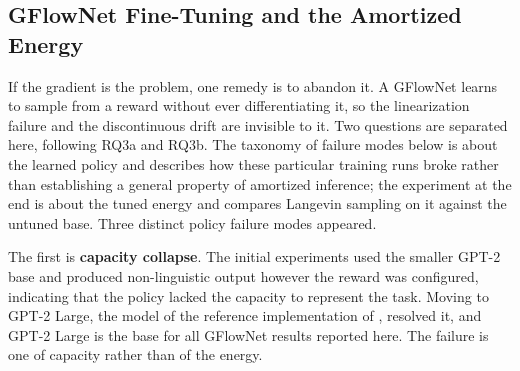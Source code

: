 
\subsection{GFlowNet Fine-Tuning and the Amortized Energy}
\label{sec:results-gfn}

If the gradient is the problem, one remedy is to abandon it. A GFlowNet \citep{bengio2021flow, hu2024amortizing} learns to sample from a reward without ever differentiating it, so the linearization failure and the discontinuous drift are invisible to it. Two questions are separated here, following RQ3a and RQ3b. The taxonomy of failure modes below is about the learned policy and describes how these particular training runs broke rather than establishing a general property of amortized inference; the experiment at the end is about the tuned energy and compares Langevin sampling on it against the untuned base. Three distinct policy failure modes appeared.

The first is \textbf{capacity collapse}. The initial experiments used the smaller GPT-2 base and produced non-linguistic output however the reward was configured, indicating that the policy lacked the capacity to represent the task. Moving to GPT-2 Large, the model of the reference implementation of \citet{hu2024amortizing}, resolved it, and GPT-2 Large is the base for all GFlowNet results reported here. The failure is one of capacity rather than of the energy.

